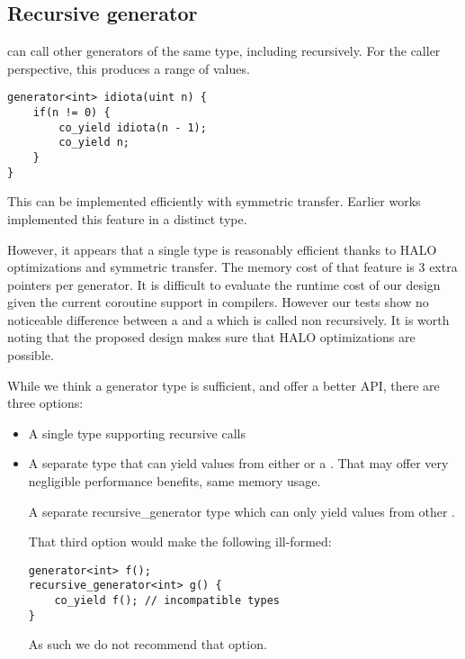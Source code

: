 \documentclass{wg21}
\begin{document}
\subsection{Recursive generator}

 can call other generators of the same type, including recursively.
For the caller perspective, this produces a range of values.

\begin{lstlisting}[style=color]
generator<int> idiota(uint n) {
    if(n != 0) {
        co_yield idiota(n - 1);
        co_yield n;
    }   
}
\end{lstlisting}

This can be implemented efficiently with symmetric transfer.
Earlier works \cite{CppCoro} implemented this feature in a distinct  type.

However, it appears that a single type is reasonably efficient thanks to HALO optimizations and symmetric transfer.
The memory cost of that feature is 3 extra pointers per generator.
It is difficult to evaluate the runtime cost of our design given the current coroutine support in compilers.
However our tests show no noticeable difference between a  and a  
which is called non recursively. It is worth noting that the proposed design makes sure that HALO \cite{P0981R0} optimizations are possible.

While we think a  generator type is sufficient, and offer a better API, there are three options:

\begin{itemize}
\item A single type supporting recursive calls

\item A separate type  that can yield values from either  or a . That may offer very negligible performance benefits, same memory usage.

\tcode A separate {recursive_generator} type which can only yield values from other . 

That third option would make the following ill-formed:

\begin{lstlisting}[style=color]
generator<int> f();
recursive_generator<int> g() {
    co_yield f(); // incompatible types
}
\end{lstlisting}

As such we do not recommend that option.

\end{itemize}
\end{document}
